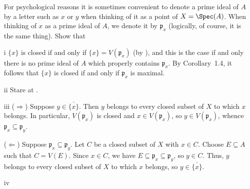 \begin{exercise}
For psychological reasons it is sometimes convenient to denote a prime ideal of \(A\) by a letter such as \(x\) or \(y\) when thinking of it as a point of \(X = \Spec(A)\).
When thinking of \(x\) as a prime ideal of \(A\), we denote it by \(\mathfrak p_x\) (logically, of course, it is the same thing).
Show that
\end{exercise}

\begin{partsolution}{i}
\(\{x\}\) is closed if and only if \(\{x\} = V(\mathfrak{p}_x)\) (by ), and this is the case if and only there is no prime ideal of \(A\) which properly contains \(\mathfrak{p}_x\).
By Corollary~1.4, it follows that \(\{x\}\) is closed if and only if \(\mathfrak{p}_x\) is maximal.
\end{partsolution}

\begin{partsolution}{ii}
Stare at .
\end{partsolution}

\begin{partsolution}{iii}
(\(\Rightarrow\))
Suppose \(y \in \bar{\{x\}}\).
Then \(y\) belongs to every closed subset of \(X\) to which \(x\) belongs.
In particular, \(V(\mathfrak{p}_x)\) is closed and \(x \in V(\mathfrak{p}_x)\), so \(y \in V(\mathfrak{p}_x)\), whence \(\mathfrak{p}_x \subseteq \mathfrak{p}_y\).

(\(\Leftarrow\))
Suppose \(\mathfrak{p}_x \subseteq \mathfrak{p}_y\).
Let \(C\) be a closed subset of \(X\) with \(x \in C\).
Choose \(E \subseteq A\) such that \(C = V(E)\).
Since \(x \in C\), we have \(E \subseteq \mathfrak{p}_x \subseteq \mathfrak{p}_y\), so \(y \in C\).
Thus, \(y\) belongs to every closed subset of \(X\) to which \(x\) belongs, so \(y \in \bar{\{x\}}\).
\end{partsolution}

\begin{partsolution}{iv}

\end{partsolution}